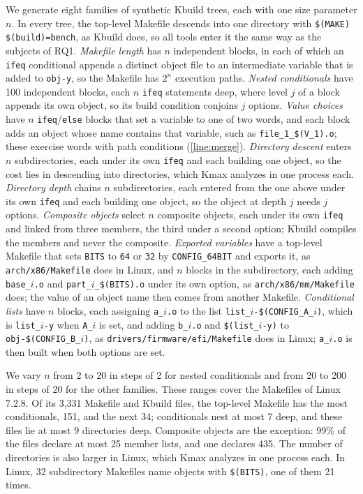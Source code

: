 \documentclass[acmsmall,screen,review,anonymous,nonacm]{acmart}
\begin{document}
We generate eight families of synthetic Kbuild trees, each with one size parameter $n$.
In every tree, the top-level Makefile descends into one directory with \texttt{\$(MAKE) \$(build)=bench}, as Kbuild does, so all tools enter it the same way as the subjects of RQ1.
\emph{Makefile length} has $n$ independent blocks, in each of which an \texttt{ifeq} conditional appends a distinct object file to an intermediate variable that is added to \texttt{obj-y}, so the Makefile has $2^n$ execution paths.
\emph{Nested conditionals} have 100 independent blocks, each $n$ \texttt{ifeq} statements deep, where level $j$ of a block appends its own object, so its build condition conjoins $j$ options.
\emph{Value choices} have $n$ \texttt{ifeq}/\texttt{else} blocks that set a variable to one of two words, and each block adds an object whose name contains that variable, such as \texttt{file\_1\_\$(V\_1).o}; these exercise words with path conditions (\autoref{line:merge}).
\emph{Directory descent} enters $n$ subdirectories, each under its own \texttt{ifeq} and each building one object, so the cost lies in descending into directories, which Kmax analyzes in one process each.
\emph{Directory depth} chains $n$ subdirectories, each entered from the one above under its own \texttt{ifeq} and each building one object, so the object at depth $j$ needs $j$ options.
\emph{Composite objects} select $n$ composite objects, each under its own \texttt{ifeq} and linked from three members, the third under a second option; Kbuild compiles the members and never the composite.
\emph{Exported variables} have a top-level Makefile that sets \texttt{BITS} to \texttt{64} or \texttt{32} by \texttt{CONFIG\_64BIT} and exports it, as \texttt{arch/x86/Makefile} does in Linux, and $n$ blocks in the subdirectory, each adding \texttt{base\_$i$.o} and \texttt{part\_$i$\_\$(BITS).o} under its own option, as \texttt{arch/x86/mm/Makefile} does; the value of an object name then comes from another Makefile.
\emph{Conditional lists} have $n$ blocks, each assigning \texttt{a\_$i$.o} to the list \texttt{list\_$i$-\$(CONFIG\_A\_$i$)}, which is \texttt{list\_$i$-y} when \texttt{A\_$i$} is set, and adding \texttt{b\_$i$.o} and \texttt{\$(list\_$i$-y)} to \texttt{obj-\$(CONFIG\_B\_$i$)}, as \texttt{drivers/firmware/efi/Makefile} does in Linux; \texttt{a\_$i$.o} is then built when both options are set.

We vary $n$ from 2 to 20 in steps of 2 for nested conditionals and from 20 to 200 in steps of 20 for the other families.
These ranges cover the Makefiles of Linux 7.2.8.
Of its 3,331 Makefile and Kbuild files, the top-level Makefile has the most conditionals, 151, and the next 34; conditionals nest at most 7 deep, and these files lie at most 9 directories deep.
Composite objects are the exception: 99\% of the files declare at most 25 member lists, and one declares 435.
The number of directories is also larger in Linux, which Kmax analyzes in one process each.
In Linux, 32 subdirectory Makefiles name objects with \texttt{\$(BITS)}, one of them 21 times.
\end{document}
